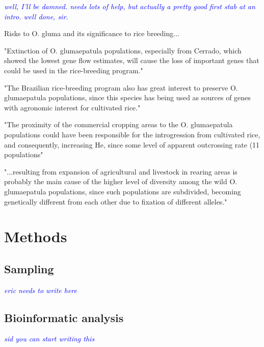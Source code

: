 \documentclass[11pt]{article} %
\newcommand{\jri}[1]{\textcolor{blue}{ \emph{\scriptsize  #1}} } %
\begin{document}
\begin{linenumbers}
\jri{well, I'll be damned. needs lots of help, but actually a pretty good first stab at an intro. well done, sir.}


Risks to O. gluma and its significance to rice breeding...

"Extinction of O. glumaepatula populations, especially from Cerrado,
which showed the lowest gene flow estimates, will cause the loss of 
important genes that could be used in the rice-breeding program."
\cite{brondani2005}

"The Brazilian rice-breeding
program also has great interest to preserve
O. glumaepatula populations, since this species has
being used as sources of genes with agronomic
interest for cultivated rice."
\cite{brondani2005}

"The proximity of the
commercial cropping areas to the O. glumaepatula
populations could have been responsible for the
introgression from cultivated rice, and consequently,
increasing He, since some level of apparent
outcrossing rate (11%
populations"
\cite{brondani2005}

"...resulting from expansion of agricultural
and livestock in rearing areas is probably the
main cause of the higher level of diversity among
the wild O. glumaepatula populations, since such
populations are subdivided, becoming genetically
different from each other due to fixation of different
alleles."
\cite{brondani2005}



\section*{Methods}
\subsection*{Sampling}
\jri{eric needs to write here}
\subsection*{Bioinformatic analysis}
\jri{sid you can start writing this}

\clearpage



\end{linenumbers}
\end{document}
